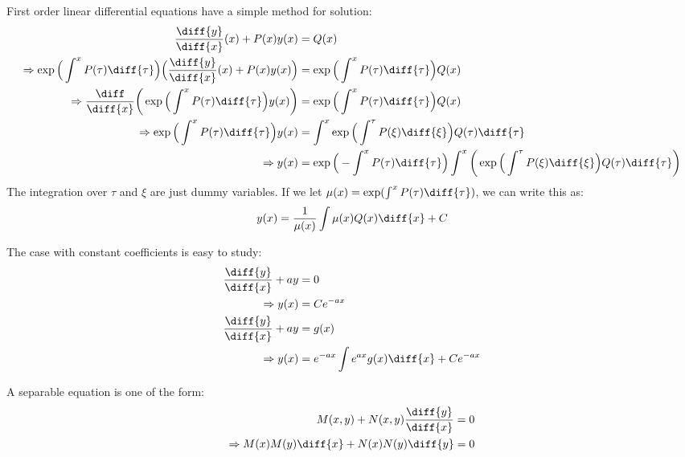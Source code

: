 \documentclass[crop=false,class=article,oneside]{standalone}
\begin{document}
        First order linear differential equations have a simple method for solution:
        \begin{align*}
            \frac{\diff{y}}{\diff{x}}(x)+P(x)y(x)&=Q(x)\\
            \Rightarrow
            \exp\Big(\int^{x}P(\tau)\diff{\tau}\Big)
            \Big(\frac{\diff{y}}{\diff{x}}(x)+P(x)y(x)\Big)
            &=\exp\Big(\int^{x}P(\tau)\diff{\tau}\Big)Q(x)\\
            \Rightarrow
            \frac{\diff}{\diff{x}}\bigg(
                \exp\Big(\int^{x}P(\tau)\diff{\tau}\Big)
                y(x)\bigg)
            &=\exp\Big(\int^{x}P(\tau)\diff{\tau}\Big)Q(x)\\
            \Rightarrow
            \exp\Big(\int^{x}P(\tau)\diff{\tau}\Big)y(x)
            &=\int^{x}\exp\Big(\int^{\tau}P(\xi)\diff{\xi}\Big)
                Q(\tau)\diff{\tau}\\
            \Rightarrow
            y(x)&=\exp\Big(-\int^{x}P(\tau)\diff{\tau}\Big)
                \int^{x}\bigg(
                    \exp\Big(\int^{\tau}P(\xi)\diff{\xi}\Big)
                    Q(\tau)\diff{\tau}
                \bigg)
        \end{align*}
        The integration over $\tau$ and $\xi$ are just dummy variables.
        If we let $\mu(x)=\exp(\int^{x}P(\tau)\diff{\tau})$, we can write this as:
        \begin{equation*}
            y(x)=\frac{1}{\mu(x)}\int\mu(x)Q(x)\diff{x}+C
        \end{equation*}
        \begin{example}
            The case with constant coefficients is easy to study:
            \begin{align*}
                \frac{\diff{y}}{\diff{x}}+ay&=0\\
                \Rightarrow{y(x)}&=Ce^{-ax}\\
                \frac{\diff{y}}{\diff{x}}+ay&=g(x)\\
                \Rightarrow{y(x)}
                &=e^{-ax}\int{e^{ax}g(x)\diff{x}}
                +Ce^{-ax}
            \end{align*}
        \end{example}
        A separable equation is one of the form:
        \begin{align*}
            M(x,y)+N(x,y)\frac{\diff{y}}{\diff{x}}&=0\\
            \Rightarrow{M(x)M(y)\diff{x}}
            +N(x)N(y)\diff{y}&=0
        \end{align*}
\end{document}
